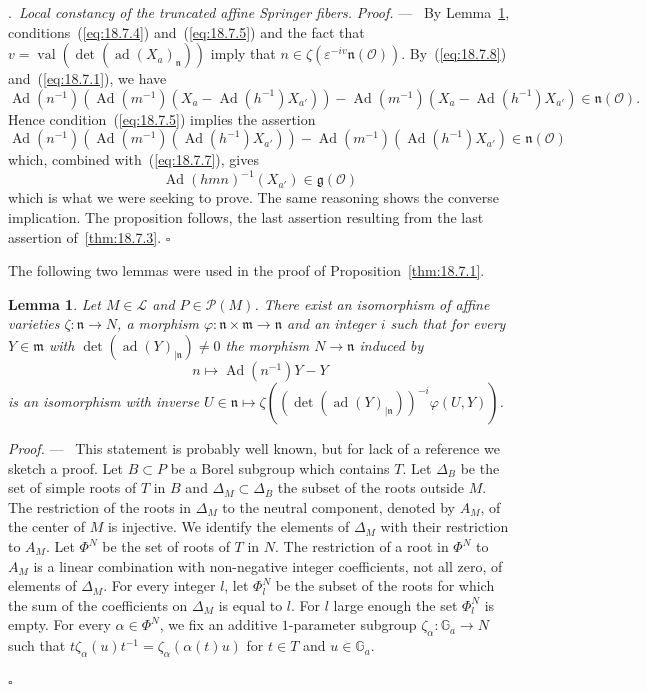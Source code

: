 \documentclass[12pt,a4paper,oneside,english,leqno]{smfart}
\makeatletter
\numberwithin{equation}{subsection}
\newcounter{theo}
\numberwithin{theo}{subsection}
\newenvironment{paragr}[1][]{\medskip\refstepcounter{subsection}%
  \par\noindent\hspace*{\parindent}\thesubsection.\ \emph{#1}%
  \@ifundefined{@empty}{}{}\ignorespaces}{\medskip}
\theoremstyle{plain}
\newtheorem{lemma}[theo]{Lemma}
\theoremstyle{definition}
\theoremstyle{remark}
\newenvironment{preuve}[1][]{\medskip\noindent\textit{Proof.} #1 ---\ }%
  {\hfill\ensuremath{\square}\medskip}
\DeclareMathOperator{\Ad}{Ad}
\DeclareMathOperator{\ad}{ad}
\DeclareMathOperator{\val}{val}
\newcommand{\oc}{\mathcal{O}}
\newcommand{\lc}{\mathcal{L}}
\newcommand{\pc}{\mathcal{P}}
\newcommand{\ggo}{\mathfrak{g}}
\newcommand{\mgo}{\mathfrak{m}}
\newcommand{\ngo}{\mathfrak{n}}
\newcommand{\al}{\alpha}
\newcommand{\eps}{\varepsilon}
\makeatother
\begin{document}
\begin{paragr}[Local constancy of the truncated affine Springer fibers.]
\begin{preuve}
By Lemma~\ref{thm:18.7.2}, conditions~(\ref{eq:18.7.4}) and~(\ref{eq:18.7.5}) and the fact that $v=\val(\det(\ad(X_a)_\ngo))$ imply that $n\in\zeta(\eps^{-iv}\ngo(\oc))$. By~(\ref{eq:18.7.8}) and~(\ref{eq:18.7.1}), we have
\begin{equation}\label{eq:18.7.9}
\Ad(n^{-1})(\Ad(m^{-1})(X_a-\Ad(h^{-1})X_{a'}))-\Ad(m^{-1})(X_a-\Ad(h^{-1})X_{a'})
\in\ngo(\oc).
\end{equation}
Hence condition~(\ref{eq:18.7.5}) implies the assertion
\begin{equation}\label{eq:18.7.10}
\Ad(n^{-1})(\Ad(m^{-1})(\Ad(h^{-1})X_{a'}))-\Ad(m^{-1})(\Ad(h^{-1})X_{a'})
\in\ngo(\oc)
\end{equation}
which, combined with~(\ref{eq:18.7.7}), gives
$$
\Ad(hmn)^{-1}(X_{a'})\in\ggo(\oc)
$$
which is what we were seeking to prove. The same reasoning shows the converse implication. The proposition follows, the last assertion resulting from the last assertion of~\ref{thm:18.7.3}.
\end{preuve}

The following two lemmas were used in the proof of Proposition~\ref{thm:18.7.1}.

\begin{lemma}\label{thm:18.7.2}
Let $M\in\lc$ and $P\in\pc(M)$. There exist an isomorphism of affine varieties $\zeta:\ngo\to N$, a morphism $\varphi:\ngo\times\mgo\to\ngo$ and an integer $i$ such that for every $Y\in\mgo$ with $\det(\ad(Y)_{|\ngo})\neq 0$ the morphism $N\to\ngo$ induced by
$$
n\mapsto\Ad(n^{-1})Y-Y
$$
is an isomorphism with inverse $U\in\ngo\mapsto \zeta((\det(\ad(Y)_{|\ngo}))^{-i}\varphi(U,Y))$.
\end{lemma}

\begin{preuve}
This statement is probably well known, but for lack of a reference we sketch a proof. Let $B\subset P$ be a Borel subgroup which contains $T$. Let $\Delta_B$ be the set of simple roots of $T$ in $B$ and $\Delta_M\subset\Delta_B$ the subset of the roots outside $M$. The restriction of the roots in $\Delta_M$ to the neutral component, denoted by $A_M$, of the center of $M$ is injective. We identify the elements of $\Delta_M$ with their restriction to $A_M$. Let $\Phi^N$ be the set of roots of $T$ in $N$. The restriction of a root in $\Phi^N$ to $A_M$ is a linear combination with non-negative integer coefficients, not all zero, of elements of $\Delta_M$. For every integer $l$, let $\Phi_l^N$ be the subset of the roots for which the sum of the coefficients on $\Delta_M$ is equal to $l$. For $l$ large enough the set $\Phi_l^N$ is empty. For every $\al\in\Phi^N$, we fix an additive $1$-parameter subgroup $\zeta_\al:\mathbb{G}_a\to N$ such that $t\zeta_\al(u)t^{-1}=\zeta_\al(\al(t)u)$ for $t\in T$ and $u\in\mathbb{G}_a$.


\end{preuve}
\end{paragr}
\end{document}
